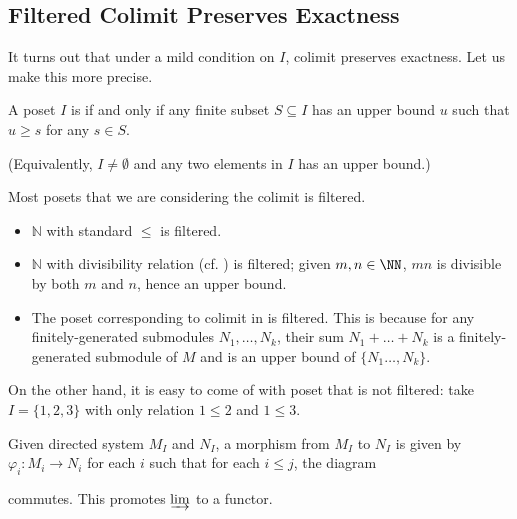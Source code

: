 \subsection{Filtered Colimit Preserves Exactness}
It turns out that under a mild condition on $I$, colimit preserves exactness.
Let us make this more precise.
\begin{definition}
    A poset $I$ is  if and only if 
    any finite subset $S\subseteq I$ has an upper bound $u$
    such that $u\geq s$ for any $s\in S$.

    (Equivalently, $I\neq\emptyset$
    and any two elements in $I$ has an upper bound.)
\end{definition}
\begin{example}
    Most posets that we are considering the colimit
    is filtered.
    \begin{itemize}
    \item $\mathbb N$ with standard $\leq$ is filtered.
    \item $\mathbb N$ with divisibility relation
    (cf. )
    is filtered; given $m,n\in\NN$, $mn$
    is divisible by both $m$ and $n$, hence an upper bound.
    \item The poset corresponding to colimit in 
     is filtered.
    This is because for any finitely-generated submodules
    $N_1,\dots,N_k$, their sum $N_1+\dots+N_k$ is a
    finitely-generated submodule of $M$
    and is an upper bound of $\{N_1\dots,N_k\}$.
    \end{itemize}
    On the other hand, it is easy to come of with 
    poset that is not filtered:
    take $I=\{1,2,3\}$ with only relation $1\leq 2$ and $1\leq 3$.
\end{example}
\begin{definition}
    Given directed system $M_I$ and $N_I$, a morphism from $M_I$
    to $N_I$ is given by $\varphi_i : M_i\to N_i$ for each $i$
    such that for each $i\leq j$, the diagram
    \begin{center}
    \end{center}
    commutes. This promotes $\varinjlim$ to a functor.
\end{definition}
